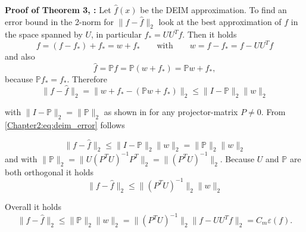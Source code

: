 \textbf{Proof of Theorem 3, \cite{Chaturantabut2010Deim}:}
Let $\hat{f}(x)$ be the DEIM approximation. To find an error bound in the 2-norm for
 $\parallel f-\hat{f} \parallel_2$ look at the best approximation of $f$ in the space spanned by $U$,
 in particular $f_* = UU^Tf$. Then it holds
\begin{equation}
 f = (f- f_*) +f_* = w +f_* \qquad \text{with} \qquad w= f-f_*=f-UU^Tf
\end{equation}
and also
\begin{equation}
 \hat{f} = \mathbb{P}f = \mathbb{P}(w +f_*) =  \mathbb{P}w + f_*,
\end{equation}
because $\mathbb{P} f_* = f_*$.
Therefore
\begin{equation}\label{Chapter2:eq:deim_error}
 \parallel f- \hat{f} \parallel_2 = \parallel w +f_* - (\mathbb{P}w + f_*) \parallel_2 \leq \parallel I - \mathbb{P}\parallel_2 \parallel w \parallel_2
\end{equation}

with $\parallel I - \mathbb{P}\parallel_2 = \parallel  \mathbb{P}\parallel_2$ as shown in
\cite{Szyld2006Norm} for any projector-matrix $P \neq 0$. From \ref{Chapter2:eq:deim_error} follows

\begin{equation}
 \parallel f- \hat{f} \parallel_2 \leq \parallel I - \mathbb{P}\parallel_2 \parallel w \parallel_2 = \parallel  \mathbb{P}\parallel_2 \parallel w \parallel_2
\end{equation}
and with $ \parallel \mathbb{P} \parallel_2= \parallel U(P^TU)^{-1}P^T  \parallel_2 = \parallel (P^TU)^{-1}  \parallel_2$.
Because $U$ and $\mathbb{P}$ are both orthogonal it holds
\begin{equation}
 \parallel f- \hat{f} \parallel_2 \leq \parallel (P^TU)^{-1}  \parallel_2 \parallel w \parallel_2
\end{equation}

Overall it holds 
\begin{equation}
 \parallel f- \hat{f} \parallel_2 \leq \parallel \mathbb{P} \parallel_2 \parallel w \parallel_2  =\parallel (P^TU)^{-1} \parallel_2  \parallel f-UU^Tf \parallel_2 =C_m \varepsilon(f).
\end{equation}

